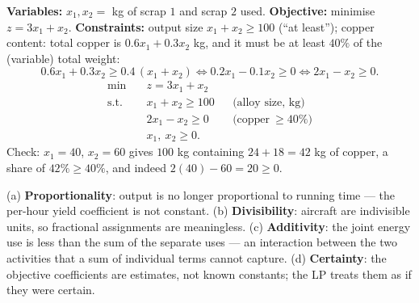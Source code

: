 \begin{solutions}
  \item \textbf{Variables:} $x_1,x_2=$ kg of scrap $1$ and scrap $2$
        used. \textbf{Objective:} minimise $z=3x_1+x_2$.
        \textbf{Constraints:} output size $x_1+x_2\ge 100$ (``at
        least''); copper content: total copper is $0.6x_1+0.3x_2$ kg, and
        it must be at least $40\%$ of the (variable) total weight:
        \[
          0.6x_1+0.3x_2\ge 0.4\,(x_1+x_2)
          \iff 0.2x_1-0.1x_2\ge 0
          \iff 2x_1-x_2\ge 0 .
        \]
        \[
          \begin{aligned}
            \min\quad & z=3x_1+x_2\\
            \text{s.t.}\quad & x_1+x_2\ge 100 &&\text{(alloy size, kg)}\\
            & 2x_1-x_2\ge 0 &&\text{(copper}\ \ge 40\%)\\
            & x_1,\ x_2\ge 0 .
          \end{aligned}
        \]
        Check: $x_1=40$, $x_2=60$ gives $100$ kg containing
        $24+18=42$ kg of copper, a share of $42\%\ge 40\%$, and indeed
        $2(40)-60=20\ge 0$.

  \item (a) \textbf{Proportionality}: output is no longer proportional
        to running time — the per-hour yield coefficient is not constant.
        (b) \textbf{Divisibility}: aircraft are indivisible units, so
        fractional assignments are meaningless.
        (c) \textbf{Additivity}: the joint energy use is less than the
        sum of the separate uses — an interaction between the two
        activities that a sum of individual terms cannot capture.
        (d) \textbf{Certainty}: the objective coefficients are estimates,
        not known constants; the LP treats them as if they were certain.


\end{solutions}
